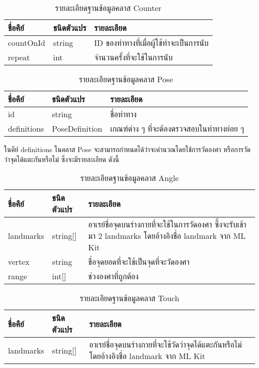 \begin{table}
    \caption{รายละเอียดฐานข้อมูลคลาส Counter}
    \begin{tabularx}{\textwidth}{ | l | l | X | }
        \hline
        \bf ชื่อคีย์			& \bf ชนิดตัวแปร		& \bf รายละเอียด    \\\hline
        countOnId			& string			& ID ของท่าทางที่เมื่อผู้ใช้ทำจะเป็นการนับ\\\hline
        repeat				& int				& จำนวนครั้งที่จะใช้ในการนับ \\\hline
    \end{tabularx}
\end{table}

\begin{table}
    \caption{รายละเอียดฐานข้อมูลคลาส Pose}
    \begin{tabularx}{\textwidth}{ | l | l | X | }
        \hline
        \bf ชื่อคีย์			& \bf ชนิดตัวแปร		& \bf รายละเอียด    \\\hline
        id					& string			& ชื่อท่าทาง           \\\hline
        definitions			& PoseDefinition	& เกณฑ์ต่าง ๆ ที่จะต้องตรวจสอบในท่าทางย่อย ๆ \\\hline
    \end{tabularx}
\end{table}

ในคีย์ definitions ในคลาส Pose จะสามารถกำหนดได้ว่าจะคำนวณโดยใช้การวัดองศา หรือการวัดว่าจุดได้แตะกันหรือไม่ ซึ่งจะมีรายละเอียด ดังนี้
\begin{table}
    \caption{รายละเอียดฐานข้อมูลคลาส Angle}
    \begin{tabularx}{\textwidth}{ | l | l | X | }
        \hline
        \bf ชื่อคีย์			& \bf ชนิดตัวแปร		& \bf รายละเอียด    \\\hline
        landmarks			& string[]			& อาเรย์ชื่อจุดบนร่างกายที่จะใช้ในการวัดองศา ซึ้งจะรับเข้ามา 2 landmarks โดยอ้างอิงชื่อ landmark จาก ML Kit\\\hline
        vertex				& string			& ชื่อจุดยอดที่จะใช้เป็นจุดที่จะวัดองศา\\\hline
        range				& int[]				& ช่วงองศาที่ถูกต้อง\\\hline
    \end{tabularx}
\end{table}

\begin{table}
    \caption{รายละเอียดฐานข้อมูลคลาส Touch}
    \begin{tabularx}{\textwidth}{ | l | l | X | }
        \hline
        \bf ชื่อคีย์			& \bf ชนิดตัวแปร		& \bf รายละเอียด    \\\hline
        landmarks			& string[]			& อาเรย์ชื่อจุดบนร่างกายที่จะใช้วัดว่าจุดได้แตะกันหรือไม่ โดยอ้างอิงชื่อ landmark จาก ML Kit\\\hline
    \end{tabularx}
\end{table}


